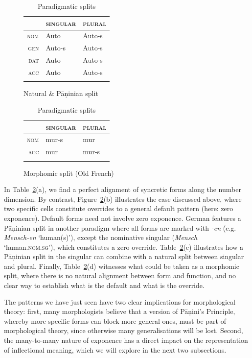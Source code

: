 \documentclass[output=paper
	        ,collection
	        ,collectionchapter
 	        ,biblatex
                ,babelshorthands
                ,newtxmath
                ,draftmode
                ,colorlinks, citecolor=brown
]{langscibook}
\begin{document}
{\begin{table}[htb]
  \begin{subfigure}{.45\textwidth}
      \begin{tabular}{r|ll}
        \lsptoprule
        & \textsc{singular} & \textsc{plural}\\
        \midrule
        \textsc{nom} & Auto & Auto-s\\
        \textsc{gen} & Auto-s & Auto-s\\
        \textsc{dat} & Auto & Auto-s\\
        \textsc{acc} & Auto & Auto-s\\
        \lspbottomrule
      \end{tabular}
      \caption{Natural \& Pāṇinian split}
    \end{subfigure}
  \begin{subfigure}{.45\textwidth}
    \begin{tabular}{r|ll}
      \lsptoprule
      & \textsc{singular} & \textsc{plural}\\
      \midrule
      \textsc{nom} & mur-s & mur\\
      \textsc{acc} & mur & mur-s\\
      \lspbottomrule
    \end{tabular}

    \caption{Morphomic split (Old French)}
  \end{subfigure}
  
  
  \caption{Paradigmatic splits}
  \label{tab:ParaSplit}
\end{table}

In Table~\ref{tab:ParaSplit}(a), we find a perfect alignment of
syncretic forms along the number dimension. By contrast,
Figure~\ref{tab:ParaSplit}(b) illustrates the case discussed above,
where two specific cells constitute overrides to a general default
pattern (here: zero exponence). Default forms need not involve zero
exponence. German features a Pāṇinian split in another paradigm where
all forms are marked with \textit{-en} (e.g. \textit{Mensch-en}
`human(s)'), except the nominative singular (\textit{Mensch}
`human\textsc{.nom.sg}'), which constitutes a zero
override. Table~\ref{tab:ParaSplit}(c) illustrates how a Pāṇinian split
in the singular can combine with a natural split between singular and
plural. Finally, Table~\ref{tab:ParaSplit}(d) witnesses what could be
taken as a morphomic split, where there is no natural alignment
between form and function, and no clear way to establish what is the
default and what is the override.

The patterns we have just seen have two clear implications for
morphological theory: first, many morphologists believe that
a version of Pāṇini's Principle, whereby more specific forms can block
more general ones, must be part of morphological theory, since
otherwise many generalisations will be lost. 
Second, the many-to-many nature of exponence has a direct impact on
the representation of inflectional meaning, which we will explore in
the next two subsections. 

}
\end{document}
